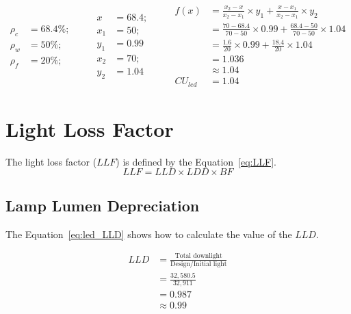 \begin{equation}
\begin{split}
\rho_c &= 68.4\%; \\
\rho_w &= 50\%; \\
\rho_f &= 20\%;
\end{split}
\qquad
\begin{split}
x &= 68.4; \\
x_1 &= 50; \\ y_1 &= 0.99 \\
x_2 &= 70; \\ y_2 &= 1.04
\end{split}
\qquad
\begin{split}
f(x) &= \frac{x_2 - x}{x_2 - x_1} \times y_1 +
       \frac{x - x_1}{x_2 - x_1} \times y_2 \\
 &= \frac{70 - 68.4}{70 - 50} \times 0.99 +
    \frac{68.4 - 50}{70 - 50} \times 1.04 \\
 &= \frac{1.6}{20} \times 0.99 +
    \frac{18.4}{20} \times 1.04 \\
 & = 1.036 \\
 & \approx 1.04 \\
CU_{led} & = 1.04
\end{split}
\label{eq:led_cu}
\end{equation}

\section{Light Loss Factor}
The light loss factor ($LLF$) is defined by the Equation~\ref{eq:LLF}.
\begin{equation}
LLF = LLD \times LDD \times BF
\label{eq:LLF}
\end{equation}

\subsection{Lamp Lumen Depreciation}
The Equation~\ref{eq:led_LLD} shows how to calculate the value of the $LLD$.

\begin{equation}
\begin{split}
LLD & = \frac{\text{Total downlight}}{\text{Design/Initial light}} \\
 & = \frac{32,580.5}{32,911} \\
 & =  0.987 \\
 & \approx 0.99
\end{split}
\label{eq:led_LLD}
\end{equation}

